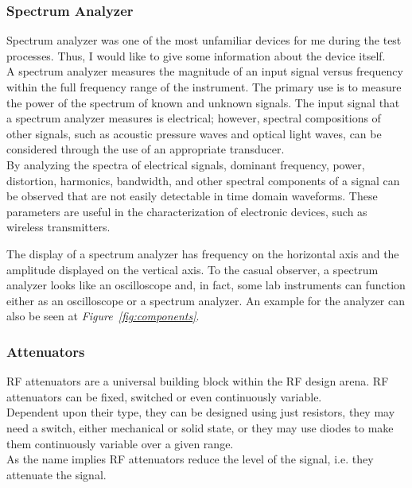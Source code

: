 \subsubsection{Spectrum Analyzer} 
\- \indent
	Spectrum analyzer was one of the most unfamiliar devices for me during the test processes. Thus, I would like to give some information about the device itself. \\
	
	A spectrum analyzer measures the magnitude of an input signal versus frequency within the full frequency range of the instrument. The primary use is to measure the power of the spectrum of known and unknown signals. The input signal that a spectrum analyzer measures is electrical; however, spectral compositions of other signals, such as acoustic pressure waves and optical light waves, can be considered through the use of an appropriate transducer. \\

	By analyzing the spectra of electrical signals, dominant frequency, power, distortion, harmonics, bandwidth, and other spectral components of a signal can be observed that are not easily detectable in time domain waveforms. These parameters are useful in the characterization of electronic devices, such as wireless transmitters.

	The display of a spectrum analyzer has frequency on the horizontal axis and the amplitude displayed on the vertical axis. To the casual observer, a spectrum analyzer looks like an oscilloscope and, in fact, some lab instruments can function either as an oscilloscope or a spectrum analyzer. An example for the analyzer can also be seen at \textit{Figure~\ref{fig:components}}.

\subsubsection{Attenuators} 
\- \indent
	RF attenuators are a universal building block within the RF design arena. RF attenuators can be fixed, switched or even continuously variable.\\

Dependent upon their type, they can be designed using just resistors, they may need a switch, either mechanical or solid state, or they may use diodes to make them continuously variable over a given range.\\

	As the name implies RF attenuators reduce the level of the signal, i.e. they attenuate the signal.\\

